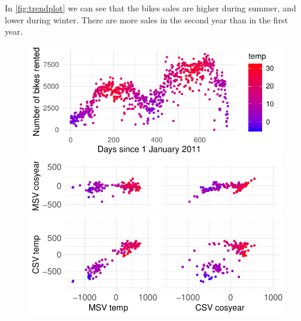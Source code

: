 \documentclass{article}
\begin{document}
In \autoref{fig:trendplot} we can see that the bikes sales are higher during summer, and lower during winter.
There are more sales in the second year than in the first year.
\begin{figure}[h!]
	\centering
	\begin{minipage}{.49\linewidth}
		\includegraphics[width=\textwidth]{figures/trend_plot.pdf}
		\includegraphics[width=\textwidth]{figures/corr_plots_top.pdf}
		\includegraphics[width=\textwidth]{figures/corr_plots_bottom.pdf}
	\end{minipage}
	\begin{minipage}{.5\linewidth}
		\vfill

\end{minipage}
\end{figure}
\end{document}
